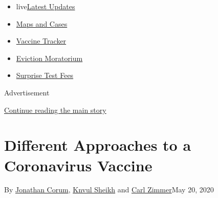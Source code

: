 \begin{itemize}
\tightlist
\item
  live\href{https://www.nytimes3xbfgragh.onion/2020/09/09/world/covid-19-coronavirus.html?name=styln-coronavirus-national\&region=TOP_BANNER\&block=storyline_menu_recirc\&action=click\&pgtype=Interactive\&impression_id=47986301-f2ab-11ea-83ce-15100f254d71\&variant=undefined}{Latest
  Updates}
\item
  \href{https://www.nytimes3xbfgragh.onion/interactive/2020/us/coronavirus-us-cases.html?name=styln-coronavirus-national\&region=TOP_BANNER\&block=storyline_menu_recirc\&action=click\&pgtype=Interactive\&impression_id=47988a10-f2ab-11ea-83ce-15100f254d71\&variant=undefined}{Maps
  and Cases}
\item
  \href{https://www.nytimes3xbfgragh.onion/interactive/2020/science/coronavirus-vaccine-tracker.html?name=styln-coronavirus-national\&region=TOP_BANNER\&block=storyline_menu_recirc\&action=click\&pgtype=Interactive\&impression_id=47988a11-f2ab-11ea-83ce-15100f254d71\&variant=undefined}{Vaccine
  Tracker}
\item
  \href{https://www.nytimes3xbfgragh.onion/2020/09/02/your-money/eviction-moratorium-covid.html?name=styln-coronavirus-national\&region=TOP_BANNER\&block=storyline_menu_recirc\&action=click\&pgtype=Interactive\&impression_id=47988a12-f2ab-11ea-83ce-15100f254d71\&variant=undefined}{Eviction
  Moratorium}
\item
  \href{https://www.nytimes3xbfgragh.onion/2020/09/09/upshot/coronavirus-surprise-test-fees.html?name=styln-coronavirus-national\&region=TOP_BANNER\&block=storyline_menu_recirc\&action=click\&pgtype=Interactive\&impression_id=47988a13-f2ab-11ea-83ce-15100f254d71\&variant=undefined}{Surprise
  Test Fees}
\end{itemize}

Advertisement

\protect\hyperlink{after-top}{Continue reading the main story}

\hypertarget{different-approaches-to-a-coronavirus-vaccine}{%
\section{Different Approaches to a Coronavirus
Vaccine}\label{different-approaches-to-a-coronavirus-vaccine}}

By \href{https://www.nytimes3xbfgragh.onion/by/jonathan-corum}{Jonathan
Corum}, \href{https://www.nytimes3xbfgragh.onion/by/knvul-sheikh}{Knvul
Sheikh} and
\href{https://www.nytimes3xbfgragh.onion/by/carl-zimmer}{Carl Zimmer}May
20, 2020

